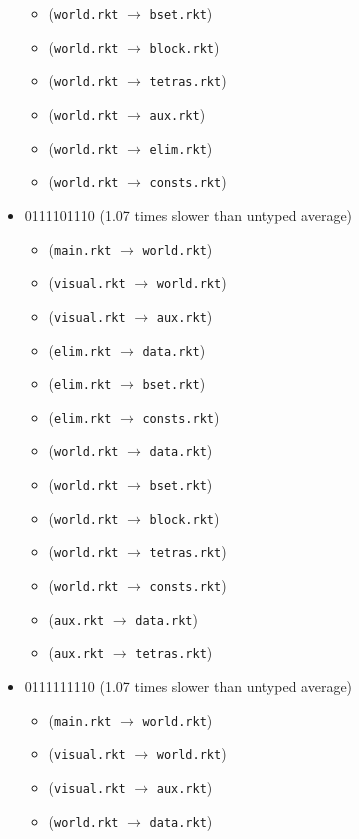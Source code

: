 \documentclass{article}
\newcommand{\mono}[1]{\texttt{#1}}
\begin{document}
\begin{itemize}
\begin{itemize}
  \item (\mono{world.rkt} $\rightarrow$ \mono{bset.rkt})
  \item (\mono{world.rkt} $\rightarrow$ \mono{block.rkt})
  \item (\mono{world.rkt} $\rightarrow$ \mono{tetras.rkt})
  \item (\mono{world.rkt} $\rightarrow$ \mono{aux.rkt})
  \item (\mono{world.rkt} $\rightarrow$ \mono{elim.rkt})
  \item (\mono{world.rkt} $\rightarrow$ \mono{consts.rkt})
  \end{itemize}
\item 0111101110 (1.07 times slower than untyped average)
  \begin{itemize}
  \item (\mono{main.rkt} $\rightarrow$ \mono{world.rkt})
  \item (\mono{visual.rkt} $\rightarrow$ \mono{world.rkt})
  \item (\mono{visual.rkt} $\rightarrow$ \mono{aux.rkt})
  \item (\mono{elim.rkt} $\rightarrow$ \mono{data.rkt})
  \item (\mono{elim.rkt} $\rightarrow$ \mono{bset.rkt})
  \item (\mono{elim.rkt} $\rightarrow$ \mono{consts.rkt})
  \item (\mono{world.rkt} $\rightarrow$ \mono{data.rkt})
  \item (\mono{world.rkt} $\rightarrow$ \mono{bset.rkt})
  \item (\mono{world.rkt} $\rightarrow$ \mono{block.rkt})
  \item (\mono{world.rkt} $\rightarrow$ \mono{tetras.rkt})
  \item (\mono{world.rkt} $\rightarrow$ \mono{consts.rkt})
  \item (\mono{aux.rkt} $\rightarrow$ \mono{data.rkt})
  \item (\mono{aux.rkt} $\rightarrow$ \mono{tetras.rkt})
  \end{itemize}
\item 0111111110 (1.07 times slower than untyped average)
  \begin{itemize}
  \item (\mono{main.rkt} $\rightarrow$ \mono{world.rkt})
  \item (\mono{visual.rkt} $\rightarrow$ \mono{world.rkt})
  \item (\mono{visual.rkt} $\rightarrow$ \mono{aux.rkt})
  \item (\mono{world.rkt} $\rightarrow$ \mono{data.rkt})

\end{itemize}
\end{itemize}
\end{document}
